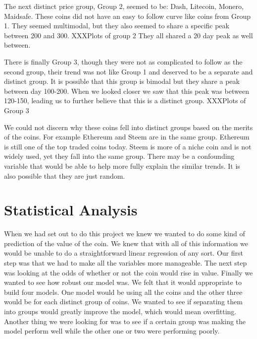 \documentclass[12pt]{article}
\begin{document}
\indent The next distinct price group, Group 2, seemed to be: Dash, Litecoin, Monero, Maidsafe. These coins did not have an easy to follow curve like coins from Group 1. They seemed multimodal, but they also seemed to share a specific peak between 200 and 300. XXXPlots of group 2 They all shared a 20 day peak as well between. 

\indent There is finally Group 3, though they were not as complicated to follow as the second group, their trend was not like Group 1 and deserved to be a separate and distinct group. It is possible that this group is bimodal but they share a peak between day 100-200. When we looked closer we saw that this peak was between 120-150, leading us to further believe that this is a distinct group. XXXPlots of Group 3

\indent We could not discern why these coins fell into distinct groups based on the merits of the coins. For example Ethereum and Steem are in the same group. Ethereum is still one of the top traded coins today. Steem is more of a niche coin and is not widely used, yet they fall into the same group. There may be a confounding variable that would be able to help more fully explain the similar trends. It is also possible that they are just random.

\section{Statistical Analysis}

\indent When we had set out to do this project we knew we wanted to do some kind of prediction of the value of the coin. We knew that with all of this information we would be unable to do a straightforward linear regression of any sort. Our first step was that we had to make all the variables more manageable. The next step was looking at the odds of whether or not the coin would rise in value. Finally we wanted to see how robust our model was. We felt that it would appropriate to build four models. One model would be using all the coins and the other three would be for each distinct group of coins. We wanted to see if separating them into groups would greatly improve the model, which would mean overfitting. Another thing we were looking for was to see if a certain group was making the model perform well while the other one or two were performing poorly.
\end{document}
